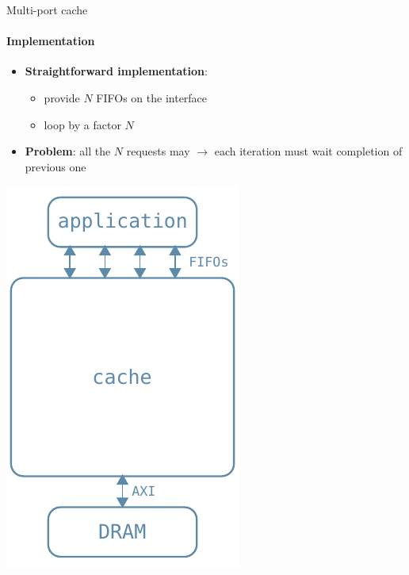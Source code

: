 \documentclass[handout]{beamer}
\begin{document}
\begin{frame}{Multi-port cache}
	\framesubtitle{Implementation}
	\begin{minipage}{.7\textwidth}
		\begin{itemize}[<+->]
			\item \textbf{Straightforward implementation}:
				\begin{itemize}[<.->]
					\item provide $N$ FIFOs on the interface
					\item {}
						loop by a factor $N$
				\end{itemize}
			\item \textbf{Problem}: all the $N$ requests may
				$\rightarrow$ each iteration must wait completion of
				previous one
		\end{itemize}
	\end{minipage}
	\begin{minipage}{.28\textwidth}
		\begin{center}
			\includegraphics[width=.9\textwidth]{multiport_arch.pdf}
		\end{center}
	\end{minipage}
\end{frame}
\end{document}
